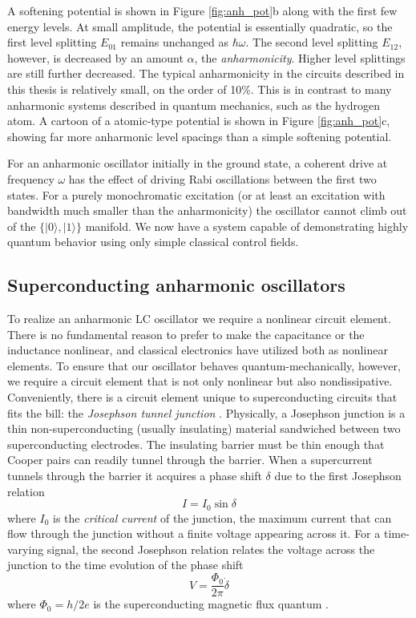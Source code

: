 A softening potential is shown in Figure \ref{fig:anh_pot}b along with the first few energy levels.  At small amplitude, the potential is essentially quadratic, so the first level splitting $E_{01}$ remains unchanged as $\hbar \omega$.  The second level splitting $E_{12}$, however, is decreased by an amount $\alpha$, the \textit{anharmonicity}.  Higher level splittings are still further decreased.  The typical anharmonicity in the circuits described in this thesis is relatively small, on the order of 10\%.  This is in contrast to many anharmonic systems described in quantum mechanics, such as the hydrogen atom.  A cartoon of a atomic-type potential is shown in Figure \ref{fig:anh_pot}c, showing far more anharmonic level spacings than a simple softening potential.

For an anharmonic oscillator initially in the ground state, a coherent drive at frequency $\omega$ has the effect of driving Rabi oscillations between the first two states.  For a purely monochromatic excitation (or at least an excitation with bandwidth much smaller than the anharmonicity) the oscillator cannot climb out of the $\{|0\rangle,|1\rangle\}$ manifold.  We now have a system capable of demonstrating highly quantum behavior using only simple classical control fields.

\subsection{Superconducting anharmonic oscillators}

To realize an anharmonic LC oscillator we require a nonlinear circuit element.  There is no fundamental reason to prefer to make the capacitance or the inductance nonlinear, and classical electronics have utilized both as nonlinear elements.  To ensure that our oscillator behaves quantum-mechanically, however, we require a circuit element that is not only nonlinear but also nondissipative.  Conveniently, there is a circuit element unique to superconducting circuits that fits the bill: the \textit{Josephson tunnel junction} \cite{scqubitsrev2008}.  Physically, a Josephson junction is a thin non-superconducting (usually insulating) material sandwiched between two superconducting electrodes.  The insulating barrier must be thin enough that Cooper pairs can readily tunnel through the barrier.  When a supercurrent tunnels through the barrier it acquires a phase shift $\delta$ due to the first Josephson relation
\begin{equation}
I = I_0 \sin{\delta}
\label{eq:CPR}
\end{equation}
where $I_0$ is the \textit{critical current} of the junction, the maximum current that can flow through the junction without a finite voltage appearing across it.  For a time-varying signal, the second Josephson relation relates the voltage across the junction to the time evolution of the phase shift
\begin{equation}
V = \frac{\Phi_0}{2\pi} \dot{\delta}
\label{eq:2nd_JR}
\end{equation}
where $\Phi_0 = h/2e$ is the superconducting magnetic flux quantum \cite{tinkham2004introduction}.

